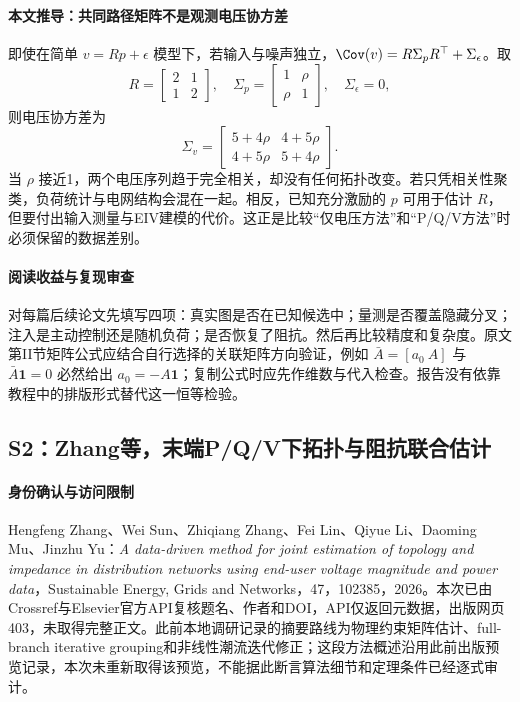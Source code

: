\paragraph{本文推导：共同路径矩阵不是观测电压协方差}
即使在简单 $v=Rp+\epsilon$ 模型下，若输入与噪声独立，$\Cov(v)=R\Sigma_pR^\top+\Sigma_\epsilon$。取
\begin{equation}
 R=\begin{bmatrix}2&1\\1&2\end{bmatrix},\quad
 \Sigma_p=\begin{bmatrix}1&\rho\\\rho&1\end{bmatrix},\quad\Sigma_\epsilon=0,
\end{equation}
则电压协方差为
\begin{equation}
 \Sigma_v=\begin{bmatrix}5+4\rho&4+5\rho\\4+5\rho&5+4\rho\end{bmatrix}.
\end{equation}
当 $\rho$ 接近1，两个电压序列趋于完全相关，却没有任何拓扑改变。若只凭相关性聚类，负荷统计与电网结构会混在一起。相反，已知充分激励的 $p$ 可用于估计 $R$，但要付出输入测量与EIV建模的代价。这正是比较“仅电压方法”和“P/Q/V方法”时必须保留的数据差别。

\paragraph{阅读收益与复现审查}
对每篇后续论文先填写四项：真实图是否在已知候选中；量测是否覆盖隐藏分叉；注入是主动控制还是随机负荷；是否恢复了阻抗。然后再比较精度和复杂度。原文第II节矩阵公式应结合自行选择的关联矩阵方向验证，例如 $\bar A=[a_0\ A]$ 与 $\bar A\mathbf1=0$ 必然给出 $a_0=-A\mathbf1$；复制公式时应先作维数与代入检查。报告没有依靠教程中的排版形式替代这一恒等检验。

\subsection{S2：Zhang等，末端P/Q/V下拓扑与阻抗联合估计}
\paragraph{身份确认与访问限制}
Hengfeng Zhang、Wei Sun、Zhiqiang Zhang、Fei Lin、Qiyue Li、Daoming Mu、Jinzhu Yu：\emph{A data-driven method for joint estimation of topology and impedance in distribution networks using end-user voltage magnitude and power data}，Sustainable Energy, Grids and Networks，47，102385，2026\citep{S2}。本次已由Crossref与Elsevier官方API复核题名、作者和DOI，API仅返回元数据，出版网页403，未取得完整正文。此前本地调研记录的摘要路线为物理约束矩阵估计、full-branch iterative grouping和非线性潮流迭代修正；这段方法概述沿用此前出版预览记录，本次未重新取得该预览，不能据此断言算法细节和定理条件已经逐式审计。


